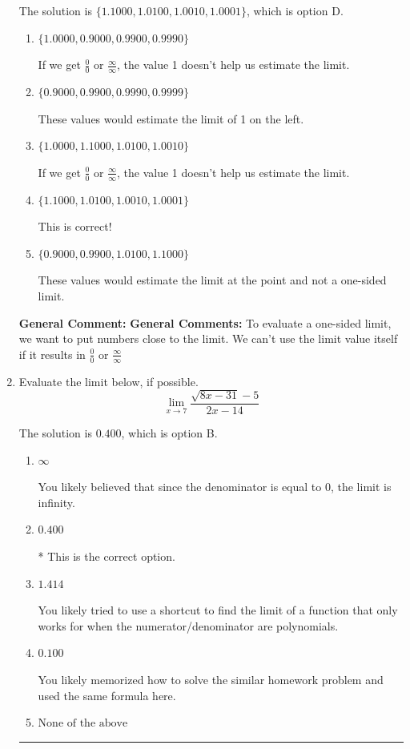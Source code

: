 \documentclass{extbook}[14pt]
\newcommand{\litem}[1]{\item #1

\rule{\textwidth}{0.4pt}}
\begin{document}
\begin{enumerate}
{The solution is \( \{ 1.1000, 1.0100, 1.0010, 1.0001 \} \), which is option D.\begin{enumerate}[label=\Alph*.]
\item \( \{ 1.0000, 0.9000, 0.9900, 0.9990 \} \)

If we get $\frac{0}{0}$ or $\frac{\infty}{\infty}$, the value 1 doesn't help us estimate the limit.
\item \( \{ 0.9000, 0.9900, 0.9990, 0.9999 \} \)

These values would estimate the limit of 1 on the left.
\item \( \{ 1.0000, 1.1000, 1.0100, 1.0010 \} \)

If we get $\frac{0}{0}$ or $\frac{\infty}{\infty}$, the value 1 doesn't help us estimate the limit.
\item \( \{ 1.1000, 1.0100, 1.0010, 1.0001 \} \)

This is correct!
\item \( \{ 0.9000, 0.9900, 1.0100, 1.1000 \} \)

These values would estimate the limit at the point and not a one-sided limit.
\end{enumerate}

\textbf{General Comment:} \textbf{General Comments:} To evaluate a one-sided limit, we want to put numbers close to the limit. We can't use the limit value itself if it results in $\frac{0}{0}$ or $\frac{\infty}{\infty}$
}
\litem{
Evaluate the limit below, if possible.
\[ \lim_{x \rightarrow 7} \frac{\sqrt{8x - 31} - 5}{2x - 14} \]

The solution is \( 0.400 \), which is option B.\begin{enumerate}[label=\Alph*.]
\item \( \infty \)

You likely believed that since the denominator is equal to 0, the limit is infinity.
\item \( 0.400 \)

* This is the correct option.
\item \( 1.414 \)

You likely tried to use a shortcut to find the limit of a function that only works for when the numerator/denominator are polynomials.
\item \( 0.100 \)

You likely memorized how to solve the similar homework problem and used the same formula here.
\item \( \text{None of the above} \)


\end{enumerate}}
\end{enumerate}
\end{document}
